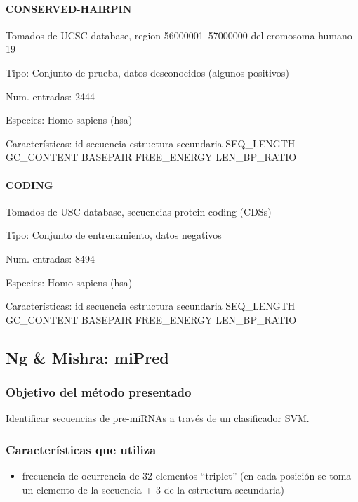\documentclass[12pt,bibliography=openstyle,DIV=12,parskip=half-]{scrartcl}
\begin{document}
\paragraph{CONSERVED-HAIRPIN}
Tomados de UCSC database, region 56000001--57000000 del cromosoma humano 19
\begin{description*}
\item[Tipo:] Conjunto de prueba, datos desconocidos (algunos positivos)
\item[Num. entradas:] 2444
\item[Especies:]  Homo sapiens (hsa)
\item[Características:]
id \quad
secuencia \quad
estructura secundaria \quad
SEQ\_LENGTH \quad
GC\_CONTENT \quad
BASEPAIR \quad
FREE\_ENERGY \quad
LEN\_BP\_RATIO
\end{description*}
\paragraph{CODING}
Tomados de USC database, secuencias protein-coding (CDSs)
\begin{description*}
\item[Tipo:] Conjunto de entrenamiento, datos negativos
\item[Num. entradas:] 8494
\item[Especies:]  Homo sapiens (hsa)
\item[Características:]
id \quad
secuencia \quad
estructura secundaria \quad
SEQ\_LENGTH \quad
GC\_CONTENT \quad
BASEPAIR \quad
FREE\_ENERGY \quad
LEN\_BP\_RATIO
\end{description*}
%
%
%
%
%
\subsection{Ng \& Mishra: miPred}
\subsubsection{Objetivo del método presentado}
Identificar secuencias de pre-miRNAs a través de un clasificador SVM.
\subsubsection{Características que utiliza}
\begin{itemize}
\item frecuencia de ocurrencia de 32 elementos ``triplet''
  (en cada posición se toma un elemento de la secuencia + 3 de la estructura secundaria)
\end{itemize}
\end{document}

